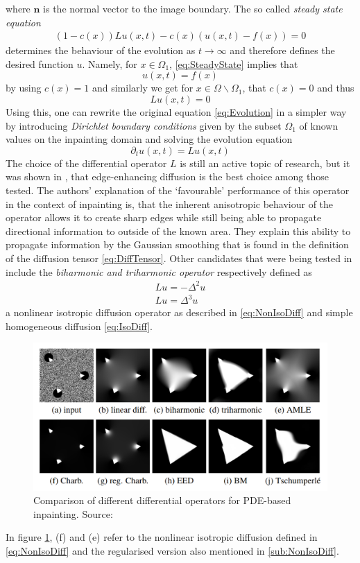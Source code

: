 where $ \mathbf{n}$ is the normal vector to the image boundary.
The so called \textit{steady state equation}
\begin{align}
    (1 - c(x))Lu(x,t)- c(x)(u(x, t) - f(x)) = 0\label{eq:SteadyState}
\end{align}
determines the behaviour of the evolution as $t\to\infty$ and therefore defines the desired
function $u$. Namely, for $x\in\Omega_1$, \eqref{eq:SteadyState} implies that 
\[ u(x,t) = f(x) \]
by using $c(x) = 1$ and similarly we get for $x\in\Omega\backslash\Omega_1$, that $c(x) = 0$ and
thus
\[ Lu(x, t) = 0 \]
Using this, one can rewrite the original equation \eqref{eq:Evolution} in a simpler way by
introducing \textit{Dirichlet boundary conditions} given by the subset $\Omega_1$ of known values on the 
inpainting domain and solving the evolution equation
\begin{equation}
    \partial_t u(x,t) = Lu(x, t)
\end{equation}
The choice of the differential operator $L$ is still an active topic of
research, but it was shown in \cite{schmaltz14}, that edge-enhancing diffusion is the best choice
among those tested.
The authors' explanation of the `favourable' performance of this operator in the context of
inpainting is, that the inherent anisotropic behaviour of the operator allows it to create sharp
edges while still being able to propagate directional information to outside of the known area.
They explain this ability to propagate information by the Gaussian smoothing that is found in the
definition of the diffusion tensor \eqref{eq:DiffTensor}.
Other candidates that were being tested in \cite{schmaltz14} include the \textit{biharmonic
and triharmonic operator} respectively defined as
\begin{eqnarray*}
    Lu = -\Delta^2u\\
    Lu = \Delta^3u
\end{eqnarray*}
a nonlinear isotropic diffusion operator as described in \eqref{eq:NonIsoDiff} and simple
homogeneous diffusion \eqref{eq:IsoDiff}.
\begin{figure}[h]
    \centering
    \includegraphics[width=\linewidth]{../Images/diffops_compare.png}
    \caption{Comparison of different differential operators for PDE-based inpainting.
    Source:\cite{schmaltz14}}
    \label{fig:DiffOpsCompare}
\end{figure}
In figure \ref{fig:DiffOpsCompare}, (f) and (e) refer to the nonlinear isotropic diffusion defined
in \eqref{eq:NonIsoDiff} and the regularised version also mentioned in \ref{sub:NonIsoDiff}.

